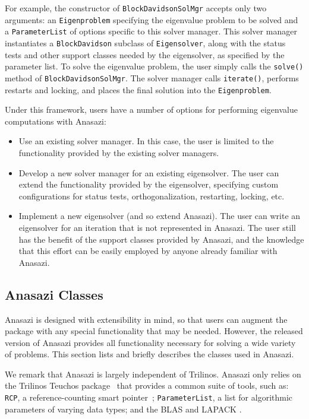 \documentclass[acmtoms]{acmtrans2m}
\newcounter{algorithm}
\newcommand{\aspace}[1]{\texttt{#1}}
\begin{document}
For example, the constructor of \aspace{BlockDavidsonSolMgr} accepts only two arguments:
an \aspace{Eigenproblem} specifying the eigenvalue problem to be solved and a
\texttt{ParameterList} of options specific to this solver manager. This solver manager
instantiates a \aspace{BlockDavidson} subclass of \aspace{Eigensolver}, along with the
status tests and other support classes needed by the eigensolver, as
specified by the parameter list. To solve the eigenvalue
problem, the user simply calls the \verb!solve()! method of \aspace{BlockDavidsonSolMgr}.
The solver manager calls \verb!iterate()!, performs restarts and locking, and places the
final solution into the \aspace{Eigenproblem}.

Under this framework, users have a number of options for performing eigenvalue
computations with Anasazi:
\begin{itemize}
\item
Use an existing solver manager. In this case, the user is limited to
the functionality provided by the existing solver managers.
\item
Develop a new solver manager for an existing eigensolver.
The user can extend the functionality provided by the eigensolver,
specifying custom configurations for status tests,
orthogonalization, restarting, locking,  etc.
\item
Implement a new eigensolver (and so extend Anasazi). The user can
write an eigensolver for an iteration that is not represented in
Anasazi. The user still has the benefit of the support classes
provided by Anasazi, and the knowledge that this effort can be
easily employed by anyone already familiar with Anasazi.
\end{itemize}


\subsection{Anasazi Classes}
\label{subsec:anasazi:classes}

Anasazi is designed with extensibility in mind, so that users can
augment the package with any special functionality that may be
needed. However, the released version of Anasazi provides all
functionality necessary for solving a wide variety of problems. This
section lists and briefly describes the classes used in Anasazi.


We remark that Anasazi is largely independent of Trilinos. Anasazi
only relies on the Trilinos Teuchos package~\cite{Trilinos:Teuchos}
that provides a common suite of tools, such as: \texttt{RCP},
a reference-counting smart pointer~\cite{Detlefs:1992:GCR};
\texttt{ParameterList}, a list for algorithmic parameters of
varying data types; and the BLAS
\cite{Lawson:1979:BLA,Blackford:2002:USB} and LAPACK \cite{abbd:95}.
\end{document}
